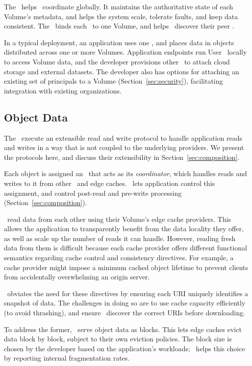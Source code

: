The \MS\ helps \SGs\ coordinate globally. It maintains the authoritative
state of each Volume's metadata, and helps the system scale, tolerate
faults, and keep data consistent.  The \MS\ binds each \SG\ to one
Volume, and helps \SGs\ discover their peer \SGs.

In a typical deployment, an application 
uses one \MS, and places data in objects distributed across one or more Volumes.
Application endpoints run User \SGs\ locally to access Volume data, and 
the developer provisions other \SGs\ to attach cloud storage and external datasets.
The developer also has options for attaching an existing set of principals to a Volume
(Section~\ref{sec:security}), facilitating integration with existing organizations.

\subsection{Object Data}

The \SGs\ execute an extensible read and write protocol to handle application reads 
and writes in a way that is not coupled to the underlying providers.  We present the
protocols here, and discuss their extensibility in Section~\ref{sec:composition}.

Each object is assigned an \SG\ that acts as its {\it coordinator}, which handles reads and writes
to it from other \SGs\ and edge caches.  \Syndicate\ lets application control this assignment,
and control post-read and pre-write processing (Section~\ref{sec:composition}).

\SGs\ read data from each other using their Volume's edge cache providers.
This allows the application to transparently benefit from the data locality they offer,
as well as scale up the number of reads it can handle.
However, reading fresh data from them is difficult because
each cache provider offers different functional semantics regarding 
cache control and consistency directives.  For example, a cache provider might
impose a minimum cached object lifetime to prevent clients from accidentally 
overwhelming an origin server.

\Syndicate\ obviates the need for these directives by ensuring each URI
uniquely identifies a snapshot of data.  The challenges in doing so
are to use cache capacity efficiently (to avoid thrashing),
and ensure \SGs\ discover the correct URIs before downloading.

To address the former, \SGs\ serve object data as blocks.
This lets edge caches evict data block by block, subject to their own eviction policies.
The block size is chosen by the developer based on the application's workloads; \Syndicate\
helps this choice by reporting internal fragmentation rates.

